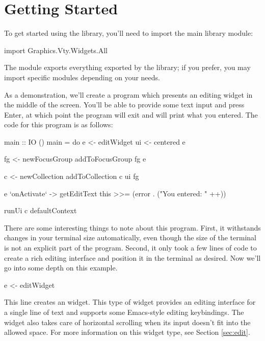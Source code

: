 \section{Getting Started}
\label{sec:gettingStarted}

To get started using the library, you'll need to import the main library
module:

\begin{haskellcode}
 import Graphics.Vty.Widgets.All
\end{haskellcode}

The  module exports everything exported by the library; if you
prefer, you may import specific modules depending on your needs.

As a demonstration, we'll create a program which presents an editing
widget in the middle of the screen.  You'll be able to provide some
text input and press Enter, at which point the program will exit and
will print what you entered.  The code for this program is as follows:

\begin{haskellcode}
 main :: IO ()
 main = do
   e <- editWidget
   ui <- centered e

   fg <- newFocusGroup
   addToFocusGroup fg e

   c <- newCollection
   addToCollection c ui fg

   e `onActivate` \this ->
     getEditText this >>= (error . ("You entered: " ++))

   runUi c defaultContext
\end{haskellcode}

There are some interesting things to note about this program.  First,
it withstands changes in your terminal size automatically, even though
the size of the terminal is not an explicit part of the program.
Second, it only took a few lines of code to create a rich editing
interface and position it in the terminal as desired.  Now we'll go
into some depth on this example.

\begin{haskellcode}
 e <- editWidget
\end{haskellcode}

This line creates an  widget.  This type of widget provides
an editing interface for a single line of text and supports some
Emacs-style editing keybindings.  The  widget also takes care
of horizontal scrolling when its input doesn't fit into the allowed
space.  For more information on this widget type, see Section
\ref{sec:edit}.

